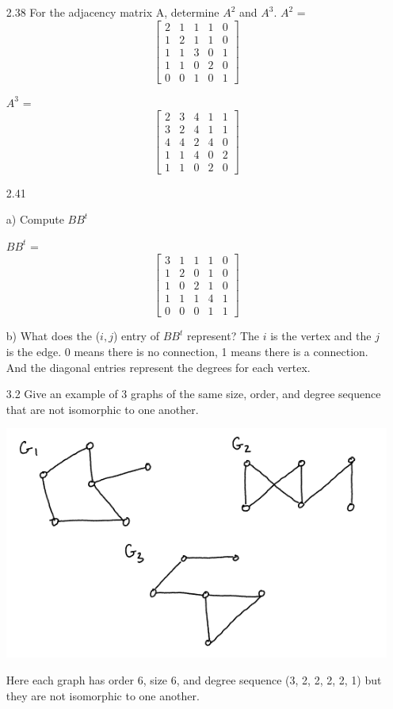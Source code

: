 \documentclass[12pt]{article}
\begin{document}
\begin{enumerate}
\item[2.38] For the adjacency matrix A, determine $A^2$ and $A^3$.
\newline
$A^2$ =
\[
\begin{bmatrix}
2 & 1 & 1 & 1 & 0 \\
1 & 2 & 1 & 1 & 0  \\
1 & 1 & 3 & 0 & 1 \\
1 & 1 & 0 & 2 & 0  \\ 
0 & 0 & 1 & 0 & 1
\end{bmatrix}
\]

$A^3$ =
\[
\begin{bmatrix}
2 & 3 & 4 & 1 & 1 \\
3 & 2 & 4 & 1 & 1  \\
4 & 4 & 2 & 4 & 0 \\
1 & 1 & 4 & 0 & 2  \\ 
1 & 1 & 0 & 2 & 0
\end{bmatrix}
\]
 
\item[2.41] 
\item[] a) Compute $BB^t$
\item[] $BB^t$ =
\[
\begin{bmatrix}
3 & 1 & 1 & 1 & 0 \\
1 & 2 & 0 & 1 & 0  \\
1 & 0 & 2 & 1 & 0 \\
1 & 1 & 1 & 4 & 1  \\ 
0 & 0 & 0 & 1 & 1
\end{bmatrix}
\]
\item[] b) What does the ($i, j$) entry of $BB^t$ represent?
\newline
The $i$ is the vertex and the $j$ is the edge. 0 means there is no connection, 1 means there is a connection. 
And the diagonal entries represent the degrees for each vertex.

\item[3.2] Give an example of 3 graphs of the same size, order, and degree sequence that are not isomorphic to one another.
\newline
\begin{center}
\includegraphics{graph.png}
\end{center}
Here each graph has order 6, size 6, and degree sequence (3, 2, 2, 2, 2, 1) but they are not isomorphic to one another.


\end{enumerate}
\end{document}
